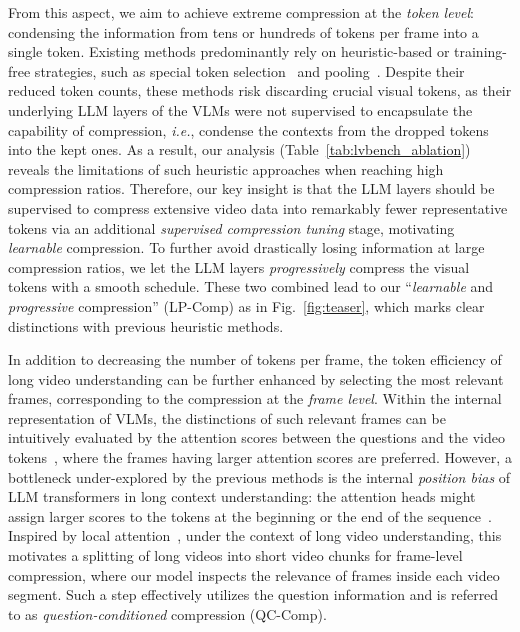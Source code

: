 From this aspect, we aim to achieve extreme compression at the \emph{token level}: condensing the information from tens or hundreds of tokens per frame into a single token. Existing methods predominantly rely on heuristic-based or training-free strategies, such as special token selection~\cite{shen2024longvu, gao2024interleaved, li2024videochat} and pooling~\cite{li2024llavanext, li2023videochat}. Despite their reduced token counts, these methods risk discarding crucial visual tokens, as their underlying LLM layers of the VLMs were not supervised to encapsulate the capability of compression, \emph{i.e.}, condense the contexts from the dropped tokens into the kept ones. As a result, our analysis (Table~\ref{tab:lvbench_ablation}) reveals the limitations of such heuristic approaches when reaching high compression ratios. Therefore, our key insight is that the LLM layers should be supervised to compress extensive video data into remarkably fewer representative tokens via an additional \emph{supervised compression tuning} stage, motivating \emph{learnable} compression. To further avoid drastically losing information at large compression ratios, we let the LLM layers \emph{progressively} compress the visual tokens with a smooth schedule. These two combined lead to our ``\emph{learnable} and \emph{progressive} compression''  (LP-Comp) as in Fig.~\ref{fig:teaser}, which marks clear distinctions with previous heuristic methods. 


In addition to decreasing the number of tokens per frame, the token efficiency of long video understanding can be further enhanced by selecting the most relevant frames, corresponding to the compression at the \emph{frame level}. Within the internal representation of VLMs, the distinctions of such relevant frames can be intuitively evaluated by the attention scores between the questions and the video tokens~\cite{gao2024interleaved}, where the frames having larger attention scores are preferred. However, a bottleneck under-explored by the previous methods is the internal \textit{position bias} of LLM transformers in long context understanding: the attention heads might assign larger scores to the tokens at the beginning or the end of the sequence~\cite{liu2023lost}. Inspired by local attention~\cite{zhang2023efficient, miao2024x, ataallah2024goldfish}, under the context of long video understanding, this motivates a splitting of long videos into short video chunks for frame-level compression, where our model inspects the relevance of frames inside each video segment. Such a step effectively utilizes the question information and is referred to as \emph{question-conditioned} compression (QC-Comp).


